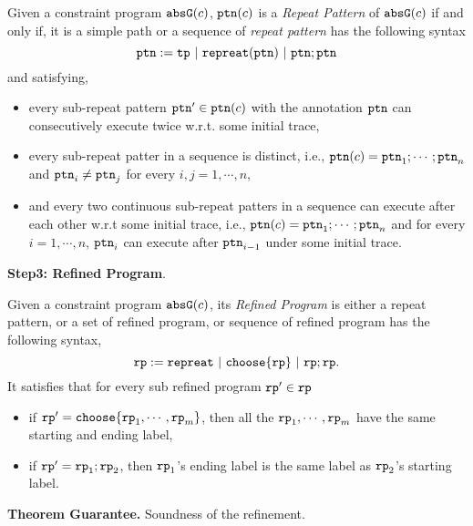 \begin{defn}
  \label{def:repeat-pattern}
  Given a constraint program ${\mathtt{abs}}{{\mathtt{G}}}(c)$,
  ${\mathtt{ptn}}(c)$ is a \emph{Repeat Pattern} of ${\mathtt{abs}}{{\mathtt{G}}}(c)$ if and only if, it is a simple path or
  a sequence of \emph{repeat pattern}
  has the following syntax
  \[
    {\mathtt{ptn}} := {\mathtt{tp}} ~|~ {\mathtt{repreat}}({\mathtt{ptn}}) ~|~ {\mathtt{ptn}}; {\mathtt{ptn}}
  \] 
  and satisfying,
  \begin{itemize}
  \item every sub-repeat pattern ${\mathtt{ptn}}' \in {\mathtt{ptn}}(c)$ with the annotation ${\mathtt{ptn}}$
  can consecutively execute twice
  w.r.t. some initial trace,
  \item every sub-repeat patter in a sequence is distinct, i.e., ${\mathtt{ptn}}(c) = {\mathtt{ptn}}_1; \cdots; {\mathtt{ptn}}_n$ and 
  ${\mathtt{ptn}}_i \neq {\mathtt{ptn}}_j$ for every $i, j = 1, \cdots, n$,
  \item and every two continuous sub-repeat patters in a sequence can execute after each other w.r.t some initial trace,
  i.e., ${\mathtt{ptn}}(c) = {\mathtt{ptn}}_1; \cdots; {\mathtt{ptn}}_n$ and for every $i = 1, \cdots, n$,
  ${\mathtt{ptn}}_i$ can execute after ${\mathtt{ptn}}_{i - 1}$ under some initial trace.
  \end{itemize}
\end{defn}
%
\textbf{Step3: Refined Program}.
\begin{defn}
  Given a constraint program ${\mathtt{abs}}{{\mathtt{G}}}(c)$,
  its \emph{Refined Program} is either a repeat pattern, or a set of refined program, or sequence of refined program has
  the following syntax,
  \[
    \rprog :=  \rprepeat ~|~ \rpchoose\left\{\rprog\right\} ~|~ \rprog; \rprog.
  \]
  It satisfies that for every sub refined program ${\mathtt{rp}}' \in {\mathtt{rp}}$
  \begin{itemize}
  \item if
   $\rprog' = \rpchoose\left\{\rprog_1, \cdots, \rprog_m \right\}$,
   then all the ${\mathtt{rp}}_1, \cdots, {\mathtt{rp}}_m$ have the same starting and ending label,
  \item if ${\mathtt{rp}}' = {\mathtt{rp}}_1; {\mathtt{rp}}_2$, then
  ${\mathtt{rp}}_1$'s ending label is the same label as ${\mathtt{rp}}_2$'s starting label.
  \end{itemize}
\end{defn}
%
\textbf{Theorem Guarantee.}
Soundness of the refinement.
